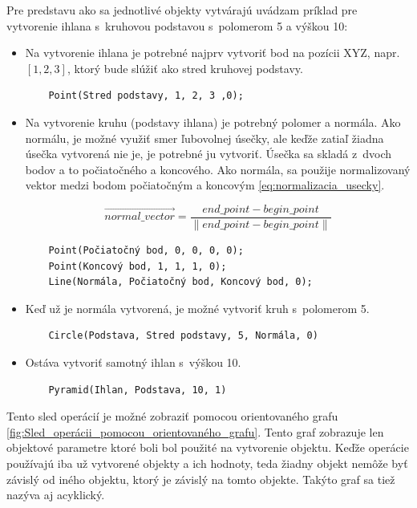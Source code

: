 Pre predstavu ako sa jednotlivé objekty vytvárajú uvádzam príklad pre vytvorenie ihlana s~kruhovou podstavou s~polomerom 5 a výškou 10:
\begin{itemize}
    \item Na vytvorenie ihlana je potrebné najprv vytvoriť bod na pozícii XYZ, napr. $\left [ 1, 2, 3 \right ]$, ktorý bude slúžiť ako stred kruhovej podstavy.
	\begin{lstlisting}
	Point(Stred podstavy, 1, 2, 3 ,0);
	\end{lstlisting}
	\item Na vytvorenie kruhu (podstavy ihlana) je potrebný polomer a normála. Ako normálu, je možné využiť smer ľubovolnej úsečky, ale keďže zatiaľ žiadna úsečka vytvorená nie je, je potrebné ju vytvoriť. Úsečka sa skladá z~dvoch bodov a to počiatočného a koncového. Ako normála, sa použije normalizovaný vektor medzi bodom počiatočným a koncovým \ref{eq:normalizacia_usecky}.

	\begin{equation}
		\overrightarrow{normal\_vector}=
		\frac{end\_point - begin\_point}{
		\left \|  end\_point - begin\_point \right \|}
	\label{eq:normalizacia_usecky}
	\end{equation}

	\begin{lstlisting}
	Point(Počiatočný bod, 0, 0, 0, 0);
	Point(Koncový bod, 1, 1, 1, 0);
	Line(Normála, Počiatočný bod, Koncový bod, 0);
	\end{lstlisting}
	\item Keď už je normála vytvorená, je možné vytvoriť kruh s~polomerom 5.
	\begin{lstlisting}
	Circle(Podstava, Stred podstavy, 5, Normála, 0) 
	\end{lstlisting}
	\item Ostáva vytvoriť samotný ihlan s~výškou 10.
	\begin{lstlisting}
	Pyramid(Ihlan, Podstava, 10, 1)
	\end{lstlisting}
\end{itemize}


Tento sled operácií je možné zobraziť pomocou orientovaného grafu \ref{fig:Sled_operácii_pomocou_orientovaného_grafu}. Tento graf zobrazuje len objektové parametre ktoré boli bol použité na vytvorenie objektu. Keďže operácie používajú iba už vytvorené objekty a ich hodnoty, teda žiadny objekt nemôže byť závislý od iného objektu, ktorý je závislý na tomto objekte. Takýto graf sa tiež nazýva aj acyklický. 


